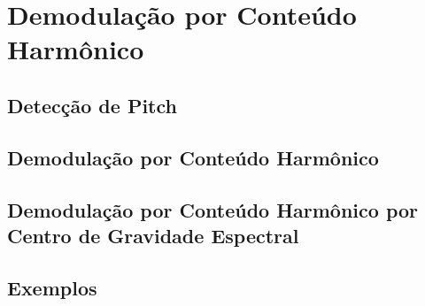\section{Demodulação por Conteúdo Harmônico}
\subsection{Detecção de Pitch}
\subsection{Demodulação por Conteúdo Harmônico}
\subsection{Demodulação por Conteúdo Harmônico por Centro de Gravidade Espectral}
\subsection{Exemplos}